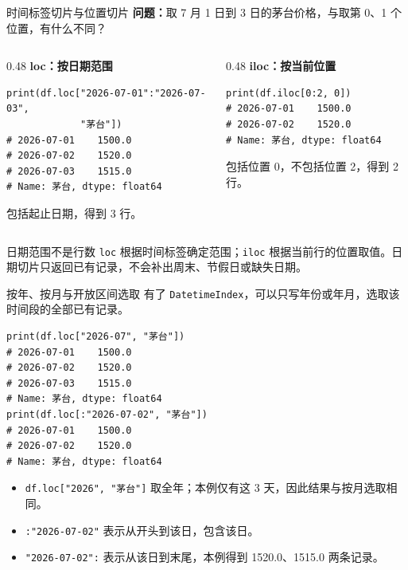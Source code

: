 \documentclass[9pt]{ctexbeamer}
\begin{document}
\begin{frame}[fragile]{时间标签切片与位置切片}
\small \textbf{问题：}取 7 月 1 日到 3 日的茅台价格，与取第 0、1 个位置，有什么不同？
\begin{columns}[T]
\begin{column}{0.48\textwidth}
\textbf{loc：按日期范围}
\begin{lstlisting}[basicstyle=\ttfamily\scriptsize]
print(df.loc["2026-07-01":"2026-07-03",
             "茅台"])
# 2026-07-01    1500.0
# 2026-07-02    1520.0
# 2026-07-03    1515.0
# Name: 茅台, dtype: float64
\end{lstlisting}
包括起止日期，得到 3 行。
\end{column}
\begin{column}{0.48\textwidth}
\textbf{iloc：按当前位置}
\begin{lstlisting}[basicstyle=\ttfamily\scriptsize]
print(df.iloc[0:2, 0])
# 2026-07-01    1500.0
# 2026-07-02    1520.0
# Name: 茅台, dtype: float64
\end{lstlisting}
包括位置 0，不包括位置 2，得到 2 行。
\end{column}
\end{columns}
\begin{block}{日期范围不是行数}
\texttt{loc} 根据时间标签确定范围；\texttt{iloc} 根据当前行的位置取值。日期切片只返回已有记录，不会补出周末、节假日或缺失日期。
\end{block}
\end{frame}

\begin{frame}[fragile]{按年、按月与开放区间选取}
\small 有了 \texttt{DatetimeIndex}，可以只写年份或年月，选取该时间段的全部已有记录。
\begin{lstlisting}
print(df.loc["2026-07", "茅台"])
# 2026-07-01    1500.0
# 2026-07-02    1520.0
# 2026-07-03    1515.0
# Name: 茅台, dtype: float64
print(df.loc[:"2026-07-02", "茅台"])
# 2026-07-01    1500.0
# 2026-07-02    1520.0
# Name: 茅台, dtype: float64
\end{lstlisting}
\begin{itemize}
\item \texttt{df.loc["2026", "茅台"]} 取全年；本例仅有这 3 天，因此结果与按月选取相同。
\item \texttt{:"2026-07-02"} 表示从开头到该日，包含该日。
\item \texttt{"2026-07-02":} 表示从该日到末尾，本例得到 1520.0、1515.0 两条记录。
\end{itemize}
\end{frame}
\end{document}
